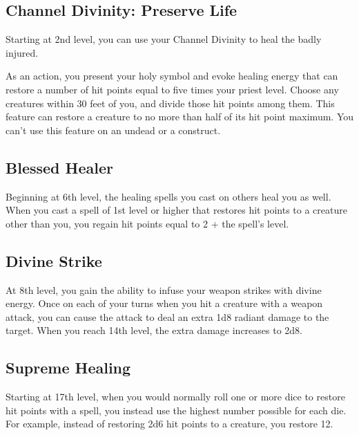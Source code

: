 \subsection{Channel Divinity: Preserve Life}

Starting at 2nd level, you can use your Channel Divinity to heal the badly injured.

As an action, you present your holy symbol and evoke healing energy that can restore a number of hit points equal to five times your priest level. Choose any creatures within 30 feet of you, and divide those hit points among them. This feature can restore a creature to no more than half of its hit point maximum. You can’t use this feature on an undead or a construct.

\subsection{Blessed Healer}

Beginning at 6th level, the healing spells you cast on others heal you as well. When you cast a spell of 1st level or higher that restores hit points to a creature other than you, you regain hit points equal to 2 + the spell’s level.

\subsection{Divine Strike}

At 8th level, you gain the ability to infuse your weapon strikes with divine energy. Once on each of your turns when you hit a creature with a weapon attack, you can cause the attack to deal an extra 1d8 radiant damage to the target. When you reach 14th level, the extra damage increases to 2d8.

\subsection{Supreme Healing}

Starting at 17th level, when you would normally roll one or more dice to restore hit points with a spell, you instead use the highest number possible for each die. For example, instead of restoring 2d6 hit points to a creature, you restore 12.